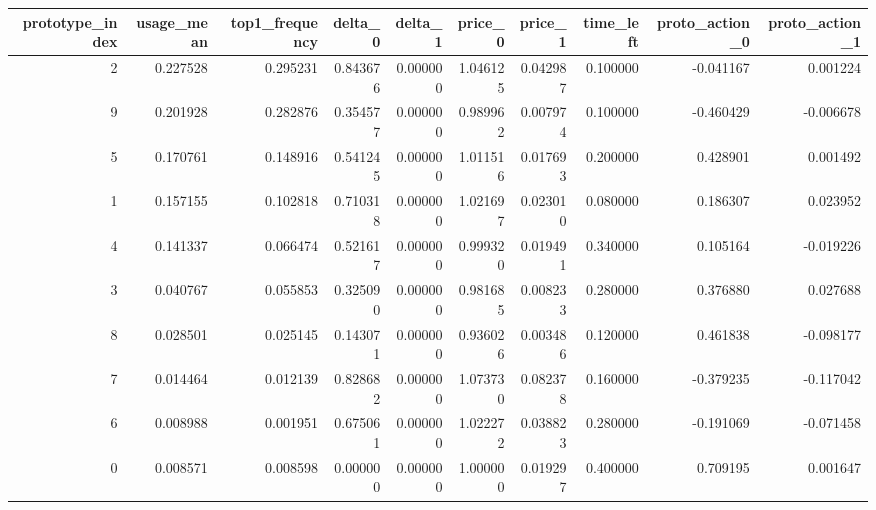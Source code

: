 \begin{tabular}{rrrrrrrrrr}
\toprule
prototype\_index & usage\_mean & top1\_frequency & delta\_0 & delta\_1 & price\_0 & price\_1 & time\_left & proto\_action\_0 & proto\_action\_1 \\
\midrule
2 & 0.227528 & 0.295231 & 0.843676 & 0.000000 & 1.046125 & 0.042987 & 0.100000 & -0.041167 & 0.001224 \\
9 & 0.201928 & 0.282876 & 0.354577 & 0.000000 & 0.989962 & 0.007974 & 0.100000 & -0.460429 & -0.006678 \\
5 & 0.170761 & 0.148916 & 0.541245 & 0.000000 & 1.011516 & 0.017693 & 0.200000 & 0.428901 & 0.001492 \\
1 & 0.157155 & 0.102818 & 0.710318 & 0.000000 & 1.021697 & 0.023010 & 0.080000 & 0.186307 & 0.023952 \\
4 & 0.141337 & 0.066474 & 0.521617 & 0.000000 & 0.999320 & 0.019491 & 0.340000 & 0.105164 & -0.019226 \\
3 & 0.040767 & 0.055853 & 0.325090 & 0.000000 & 0.981685 & 0.008233 & 0.280000 & 0.376880 & 0.027688 \\
8 & 0.028501 & 0.025145 & 0.143071 & 0.000000 & 0.936026 & 0.003486 & 0.120000 & 0.461838 & -0.098177 \\
7 & 0.014464 & 0.012139 & 0.828682 & 0.000000 & 1.073730 & 0.082378 & 0.160000 & -0.379235 & -0.117042 \\
6 & 0.008988 & 0.001951 & 0.675061 & 0.000000 & 1.022272 & 0.038823 & 0.280000 & -0.191069 & -0.071458 \\
0 & 0.008571 & 0.008598 & 0.000000 & 0.000000 & 1.000000 & 0.019297 & 0.400000 & 0.709195 & 0.001647 \\
\bottomrule
\end{tabular}

